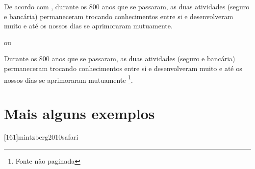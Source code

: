 De acordo com \textcite[cap. 1]{cnseg2017mercado}, durante os 800 anos que se passaram,
as duas atividades (seguro e bancária) permaneceram trocando conhecimentos entre si e
desenvolveram muito e até os nossos dias se aprimoraram mutuamente.

ou

Durante os 800 anos que se passaram, as duas atividades (seguro e bancária) permaneceram
trocando conhecimentos entre si e desenvolveram muito e até os nossos dias se aprimoraram
mutuamente \parencite[cap. 1]{cnseg2017mercado}\footnote{Fonte não paginada}.

\section{Mais alguns exemplos}

\cite[ver:][30--42]{churchill2012marketing}

\textcites[142-146]{churchill2012marketing}[21--23]{biolife2008}[45]{simon1997administrative}

\cites[142-146]{churchill2012marketing}[21--23]{biolife2008}[45]{simon1997administrative}

\cite{nouri2025}

\cite{marginalrevolutionBordaCount}

[161]{mintzberg2010safari}